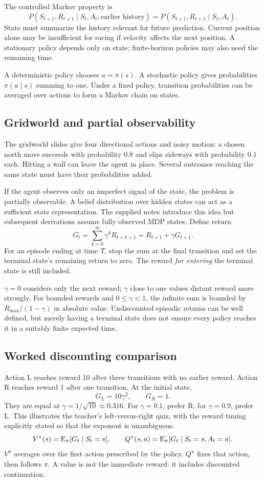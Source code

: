 \documentclass[11pt]{article}
\begin{document}
The controlled Markov property is
\[
P(S_{t+1},R_{t+1}\mid S_t,A_t,\text{earlier history})
=P(S_{t+1},R_{t+1}\mid S_t,A_t).
\]
State must summarize the history relevant for future prediction. Current position alone may be insufficient for racing if velocity affects the next position. A stationary policy depends only on state; finite-horizon policies may also need the remaining time.

A deterministic policy chooses $a=\pi(s)$. A stochastic policy gives probabilities $\pi(a\mid s)$ summing to one. Under a fixed policy, transition probabilities can be averaged over actions to form a Markov chain on states.
\subsection{Gridworld and partial observability}
The gridworld slides give four directional actions and noisy motion: a chosen north move succeeds with probability $0.8$ and slips sideways with probability $0.1$ each. Hitting a wall can leave the agent in place. Several outcomes reaching the same state must have their probabilities added.

If the agent observes only an imperfect signal of the state, the problem is partially observable. A belief distribution over hidden states can act as a sufficient state representation. The supplied notes introduce this idea but subsequent derivations assume fully observed MDP states.
Define return
\[
G_t=\sum_{k=0}^{\infty}\gamma^kR_{t+k+1}
=R_{t+1}+\gamma G_{t+1}.
\]
For an episode ending at time $T$, stop the sum at the final transition and set the terminal state's remaining return to zero. The reward \emph{for entering} the terminal state is still included.

$\gamma=0$ considers only the next reward; $\gamma$ close to one values distant reward more strongly. For bounded rewards and $0\leq\gamma<1$, the infinite sum is bounded by $R_{\max}/(1-\gamma)$ in absolute value. Undiscounted episodic returns can be well defined, but merely having a terminal state does not ensure every policy reaches it in a suitably finite expected time.
\subsection{Worked discounting comparison}
Action L reaches reward 10 after three transitions with no earlier reward. Action R reaches reward 1 after one transition. At the initial state,
\[
G_L=10\gamma^2,\qquad G_R=1.
\]
They are equal at $\gamma=1/\sqrt{10}\approx0.316$. For $\gamma=0.1$, prefer R; for $\gamma=0.9$, prefer L. This illustrates the teacher's left-versus-right quiz, with the reward timing explicitly stated so that the exponent is unambiguous.
\[
V^\pi(s)=\operatorname{E}_\pi[G_t\mid S_t=s],\qquad
Q^\pi(s,a)=\operatorname{E}_\pi[G_t\mid S_t=s,A_t=a].
\]
$V^\pi$ averages over the first action prescribed by the policy. $Q^\pi$ fixes that action, then follows $\pi$. A value is not the immediate reward: it includes discounted continuation.
\end{document}
